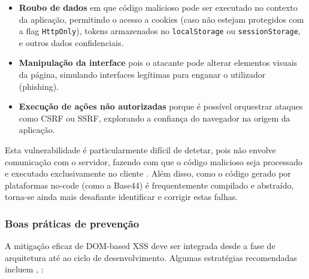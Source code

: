 \begin{itemize}
    \item \textbf{Roubo de dados} em que código malicioso pode ser executado no contexto da aplicação, permitindo o acesso a cookies (caso não estejam protegidos com a flag \texttt{HttpOnly}), tokens armazenados no \texttt{localStorage} ou \texttt{sessionStorage}, e outros dados confidenciais.
    
    \item \textbf{Manipulação da interface} pois o atacante pode alterar elementos visuais da página, simulando interfaces legítimas para enganar o utilizador (phishing).
    
    \item \textbf{Execução de ações não autorizadas} porque é possível orquestrar ataques como CSRF ou SSRF, explorando a confiança do navegador na origem da aplicação.
\end{itemize}

Esta vulnerabilidade é particularmente difícil de detetar, pois não envolve comunicação com o servidor, fazendo com que o código malicioso seja processado e executado exclusivamente no cliente \cite{ref30}. Além disso, como o código gerado por plataformas no-code (como a Base44) é frequentemente compilado e abstraído, torna-se ainda mais desafiante identificar e corrigir estas falhas.

\subsubsection{Boas práticas de prevenção}
\label{subsubsec:boas-praticas-prevencao-dom-xss}

A mitigação eficaz de DOM-based XSS deve ser integrada desde a fase de arquitetura até ao ciclo de desenvolvimento. Algumas estratégias recomendadas incluem \cite{ref31}, \cite{ref32}:

